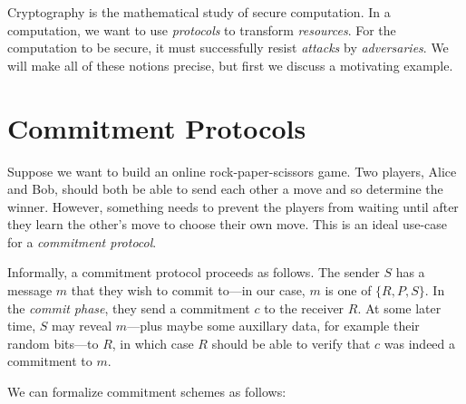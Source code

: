 
Cryptography is the mathematical study of secure computation. In a computation,
we want to use \emph{protocols} to transform \emph{resources}. For the
computation to be secure, it must successfully resist \emph{attacks} by
\emph{adversaries}. We will make all of these notions precise, but first we
discuss a motivating example.

\section{Commitment Protocols}

Suppose we want to build an online rock-paper-scissors game. Two players, Alice
and Bob, should both be able to send each other a move and so determine the
winner. However, something needs to prevent the players from waiting until after
they learn the other's move to choose their own move. This is an ideal use-case
for a \emph{commitment protocol}.

Informally, a commitment protocol proceeds as follows. The sender $S$ has a
message $m$ that they wish to commit to---in our case, $m$ is one of
$\{R,P,S\}$. In the \emph{commit phase}, they send a commitment $c$ to the
receiver $R$. At some later time, $S$ may reveal $m$---plus maybe some auxillary
data, for example their random bits---to $R$, in which case $R$ should be able
to verify that $c$ was indeed a commitment to $m$.

We can formalize commitment schemes as follows:

